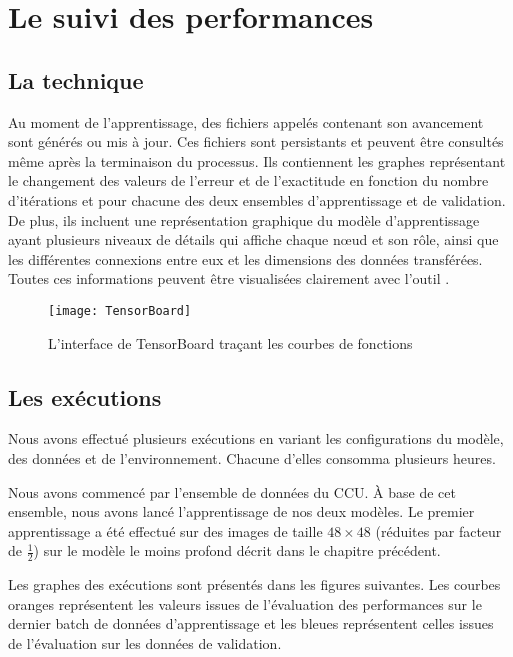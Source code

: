 \section{Le suivi des performances}

\subsection{La technique}

Au moment de l'apprentissage, des fichiers appelés 
contenant son avancement sont générés ou mis à jour. Ces fichiers sont persistants
et peuvent être consultés même après la terminaison du processus. Ils contiennent les graphes
représentant le changement des valeurs de l'erreur et de l'exactitude en fonction
du nombre d'itérations et pour chacune des deux ensembles d'apprentissage et de
validation. De plus, ils incluent une représentation graphique du modèle
d'apprentissage ayant plusieurs niveaux de détails qui affiche chaque nœud et son
rôle, ainsi que les différentes connexions entre eux et les dimensions des données
transférées. Toutes ces informations peuvent être visualisées clairement avec
l'outil .

\begin{figure}[h]
  \centering
  \texttt{[image: TensorBoard]}
  \caption{L'interface de TensorBoard traçant les courbes de fonctions}
\end{figure}

\subsection{Les exécutions}

Nous avons effectué plusieurs exécutions en variant les configurations du modèle,
des données et de l'environnement. Chacune d'elles consomma plusieurs heures.

Nous avons commencé par l'ensemble de données du CCU. \`A base de cet ensemble,
nous avons lancé l'apprentissage de nos deux modèles. Le premier apprentissage
a été effectué sur des images de taille $48 \times 48$ (réduites par facteur de
$\frac{1}{2}$) sur le modèle le moins profond décrit dans le chapitre précédent.

Les graphes des exécutions sont présentés dans les figures suivantes. Les courbes oranges
représentent les valeurs issues de l'évaluation des performances sur le dernier batch
de données d'apprentissage et les bleues représentent celles issues de l'évaluation
sur les données de validation.

